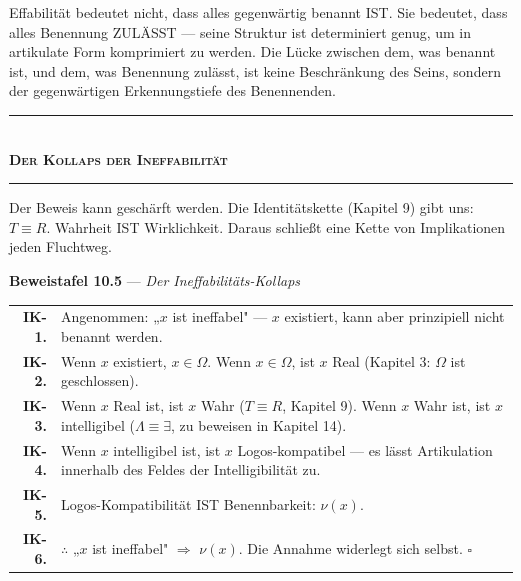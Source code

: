 \documentclass[10pt, openany, oneside]{book}
\renewcommand{\normalsize}{\fontsize{10}{13}\selectfont}
\renewcommand{\footnotesize}{\fontsize{8.5}{11}\selectfont}
\begin{document}
Effabilität bedeutet nicht, dass alles gegenwärtig benannt IST. Sie bedeutet, dass alles Benennung ZULÄSST --- seine Struktur ist determiniert genug, um in artikulate Form komprimiert zu werden. Die Lücke zwischen dem, was benannt ist, und dem, was Benennung zulässt, ist keine Beschränkung des Seins, sondern der gegenwärtigen Erkennungstiefe des Benennenden.

\vspace{1.5em}


\begin{center}
    \rule{0.3\textwidth}{0.4pt}\\[0.5em]
    {\normalsize\bfseries\scshape Der Kollaps der Ineffabilität}\\[0.3em]
    \rule{0.3\textwidth}{0.4pt}
\end{center}

\vspace{1em}

\noindent Der Beweis kann geschärft werden. Die Identitätskette (Kapitel 9) gibt uns: $T \equiv R$. Wahrheit IST Wirklichkeit. Daraus schließt eine Kette von Implikationen jeden Fluchtweg.

\textbf{Beweistafel 10.5} --- \textit{Der Ineffabilitäts-Kollaps}

\vspace{0.5em}

{\footnotesize
\noindent\begin{tabular}{r p{}}
\textbf{IK-1.} & Angenommen: „$x$ ist ineffabel" --- $x$ existiert, kann aber prinzipiell nicht benannt werden. \\[0.3em]
\textbf{IK-2.} & Wenn $x$ existiert, $x \in \Omega$. Wenn $x \in \Omega$, ist $x$ Real (Kapitel 3: $\Omega$ ist geschlossen). \\[0.3em]
\textbf{IK-3.} & Wenn $x$ Real ist, ist $x$ Wahr ($T \equiv R$, Kapitel 9). Wenn $x$ Wahr ist, ist $x$ intelligibel ($\Lambda \equiv \exists$, zu beweisen in Kapitel 14). \\[0.3em]
\textbf{IK-4.} & Wenn $x$ intelligibel ist, ist $x$ Logos-kompatibel --- es lässt Artikulation innerhalb des Feldes der Intelligibilität zu. \\[0.3em]
\textbf{IK-5.} & Logos-Kompatibilität IST Benennbarkeit: $\nu(x)$. \\[0.3em]
\textbf{IK-6.} & $\therefore$ „$x$ ist ineffabel" $\Rightarrow$ $\nu(x)$. Die Annahme widerlegt sich selbst. $\square$ \\[0.3em]
\end{tabular}
}
\end{document}
